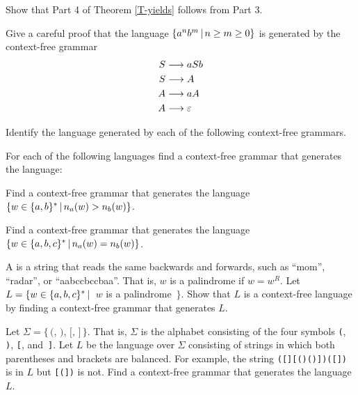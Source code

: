 \begin{exercises}

\problem Show that Part 4 of Theorem \ref{T-yields} follows from Part 3.

\problem Give a careful proof that the language $\{a^nb^m\,|\, n\ge m\ge 0\}$
is generated by the context-free grammar
\begin{align*}
      S&\longrightarrow aSb\\
      S&\longrightarrow A\\
      A&\longrightarrow aA\\
      A&\longrightarrow \varepsilon
\end{align*}

\problem Identify the language generated by each of the following
context-free grammars.
\smallskip
{}
\smallskip

\problem For each of the following languages
find a context-free grammar that generates the language:

\problem Find a context-free grammar that generates the language
$\{w\in\{a,b\}^*\,|\, n_a(w) > n_b(w)\}$.

\problem Find a context-free grammar that generates the language
$\{w\in\{a,b,c\}^*\,|\, n_a(w) = n_b(w)\}$.

\problem A  is a string that reads the same
backwards and forwards, such as ``mom'', ``radar'', or
``aabccbccbaa''.  That is, $w$ is a palindrome if $w=w^R$.
Let $L=\{w\in\{a,b,c\}^*\,|\,$ $w$ is a palindrome~$\}$.
Show that $L$ is a context-free language by finding a context-free
grammar that generates $L$.

\problem Let $\Sigma=\{\,\texttt{(},\,\texttt{)},\,\texttt{[},\,\texttt{]}\,\}$.  That is, $\Sigma$
is the alphabet consisting of the four symbols \texttt{(}, \texttt{)}, \texttt{[}, and~\texttt{]}.
Let $L$ be the language over $\Sigma$ consisting of strings
in which both parentheses and brackets are balanced.
For example, the string \texttt{([][()()])([])} is in $L$
but \texttt{[(])} is not.  Find a context-free grammar that generates the
language $L$.


\end{exercises}
